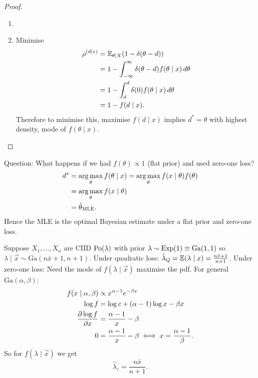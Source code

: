 \documentclass[10pt, a4paper]{article}
\begin{document}
\begin{proposition}
\begin{proof}
\begin{enumerate}[label = (\roman*)]
            \item \phantom{}

            \item Minimise
            \begin{align*}
                \rho ^ {(d \mid x)} &= \E_{\theta \mid X}(1 - \delta(\theta - d)) \\
                &= 1 - \int_{-\infty}^{\infty}\delta(\theta - d)f(\theta \mid x)\,d\theta \\
                &= 1 - \int_{d}^{d}\delta(0)f(\theta \mid x)\,d\theta \\
                &= 1 - f(d\mid x).
            \end{align*}
            Therefore to minimise this,
            maximise $f(d\mid x)$ implies $d ^ {*} = \theta$ with highest density,
            mode of $f(\theta \mid x)$.
        \end{enumerate}
    \end{proof}
\end{proposition}

Question:
What happens if we had $f(\theta) \propto 1$
(flat prior)
and used zero-one loss?
\begin{align*}
    d ^ {*} &= \argmax_{\theta}f(\theta \mid x) = \argmax_{\theta}f(x \mid \theta)f(\theta) \\
    &= \argmax_{\theta}f(x \mid \theta) \\
    &= \hat{\theta}_{\text{MLE}}.
\end{align*}
Hence the MLE is the optimal Bayesian estimate under a flat prior and zero-one loss.

\begin{example}
    Suppose $X_1, \dotsc, X_n$ are CIID $\Po(\lambda)$ with prior $\lambda \sim \Exp(1) \equiv \mathrm{Ga}(1, 1)$ so $\lambda \mid \vec{x} \sim \mathrm{Ga}(n\bar{x} + 1, n + 1)$.
    Under quadratic loss:
    $\hat{\lambda}_{Q} = \E(\lambda \mid x) = \frac{n\bar{x} + 1}{n + 1}$.
    Under zero-one loss:
    Need the mode of $f(\lambda \mid \vec{x})$ maximise the pdf.
    For general $\mathrm{Ga}(\alpha, \beta)$:
    \begin{align*}
        f(x \mid \alpha, \beta) &\propto x ^ {\alpha - 1}e ^ {-\beta x} \\
        \log{f} &= \log{c} + (\alpha - 1)\log{x} - \beta x \\
        \pd[\log{f}]{x} &= \frac{\alpha - 1}{x} - \beta \\
        0 &= \frac{\alpha - 1}{x} - \beta \iff x = \frac{\alpha - 1}{\beta}.
    \end{align*}
    So for $f(\lambda \mid \vec{x})$ we get
    \[
    \hat{\lambda}_z = \frac{n\bar{x}}{n + 1}.
    \]
\end{example}
\end{document}
